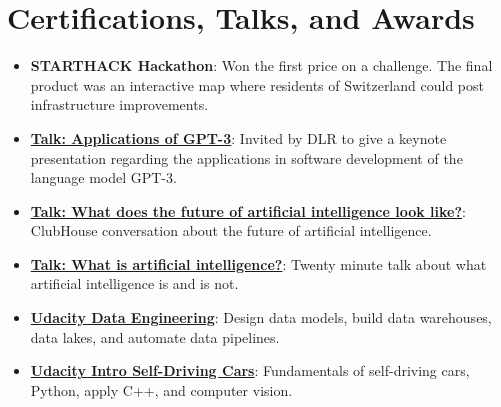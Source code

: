 \documentclass[letterpaper,11pt]{article}
\newcommand{\resumeItem}[2]{
  \item\small{
    \textbf{#1}{: #2 \vspace{-2pt}}
  }
}
\newcommand{\resumeSubItem}[2]{\resumeItem{#1}{#2}\vspace{-4pt}}
\newcommand{\resumeSubHeadingListStart}{\begin{itemize}[leftmargin=*]}
\newcommand{\resumeSubHeadingListEnd}{\end{itemize}}
\begin{document}
\section{Certifications, Talks, and Awards}
  \resumeSubHeadingListStart
    \resumeSubItem{STARTHACK Hackathon}
      {Won the first price on a challenge. The final product was an interactive map where residents of Switzerland could post infrastructure improvements.}
    \resumeSubItem{\href{https://florianwoelki-dlr-slides.vercel.app/}{Talk: Applications of GPT-3}}
      {Invited by DLR to give a keynote presentation regarding the applications in software development of the language model GPT-3.}
    \resumeSubItem{\href{https://youtu.be/cZ--7TzyzfM}{Talk: What does the future of artificial intelligence look like?}}
      {ClubHouse conversation about the future of artificial intelligence.}
    \resumeSubItem{\href{https://youtu.be/m9kapfxwYOA}{Talk: What is artificial intelligence?}}
      {Twenty minute talk about what artificial intelligence is and is not.}
    \resumeSubItem{\href{https://github.com/FlorianWoelki/portfolio/blob/master/src/assets/certificates/data-engineering.pdf}{Udacity Data Engineering}}
      {Design data models, build data warehouses, data lakes, and automate data pipelines.}
    \resumeSubItem{\href{https://github.com/FlorianWoelki/portfolio/blob/master/src/assets/certificates/intro-self-driving-cars.pdf}{Udacity Intro Self-Driving Cars}}
      {Fundamentals of self-driving cars, Python, apply C++, and computer vision.}
  \resumeSubHeadingListEnd
\end{document}
